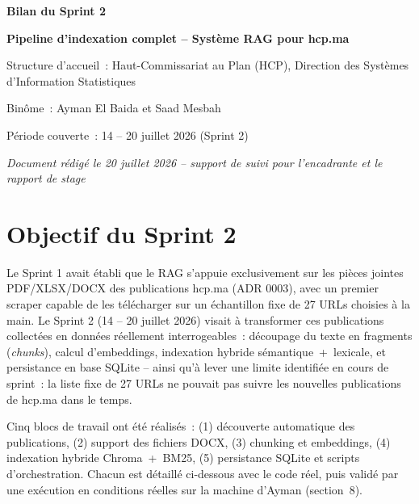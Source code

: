 \documentclass[11pt,a4paper]{article}
\begin{document}
\begin{titlepage}
\centering
\vspace*{2cm}
{\Huge\bfseries\color{navy} Bilan du Sprint 2\par}
\vspace{0.5cm}
{\Large\bfseries\color{gold} Pipeline d'indexation complet -- Syst\`eme RAG pour hcp.ma\par}
\vspace{1.5cm}
{\large\color{greytext} Structure d'accueil~: Haut-Commissariat au Plan (HCP), Direction des Syst\`emes d'Information Statistiques\par}
\vspace{0.3cm}
{\large\color{greytext} Bin\^ome~: Ayman El Baida et Saad Mesbah\par}
\vspace{0.3cm}
{\large\color{greytext} P\'eriode couverte~: 14 -- 20 juillet 2026 (Sprint 2)\par}
\vspace{0.3cm}
{\large\itshape\color{greytext} Document r\'edig\'e le 20 juillet 2026 -- support de suivi pour l'encadrante et le rapport de stage\par}
\vfill
\end{titlepage}

\tableofcontents
\newpage

\section{Objectif du Sprint 2}
Le Sprint 1 avait \'etabli que le RAG s'appuie exclusivement sur les pi\`eces jointes PDF/XLSX/DOCX des publications hcp.ma (ADR 0003), avec un premier scraper capable de les t\'el\'echarger sur un \'echantillon fixe de 27 URLs choisies \`a la main. Le Sprint 2 (14 -- 20 juillet 2026) visait \`a transformer ces publications collect\'ees en donn\'ees r\'eellement interrogeables~: d\'ecoupage du texte en fragments (\emph{chunks}), calcul d'embeddings, indexation hybride s\'emantique~+~lexicale, et persistance en base SQLite -- ainsi qu'\`a lever une limite identifi\'ee en cours de sprint~: la liste fixe de 27 URLs ne pouvait pas suivre les nouvelles publications de hcp.ma dans le temps.

Cinq blocs de travail ont \'et\'e r\'ealis\'es~: (1) d\'ecouverte automatique des publications, (2) support des fichiers DOCX, (3) chunking et embeddings, (4) indexation hybride Chroma~+~BM25, (5) persistance SQLite et scripts d'orchestration. Chacun est d\'etaill\'e ci-dessous avec le code r\'eel, puis valid\'e par une ex\'ecution en conditions r\'eelles sur la machine d'Ayman (section~8).
\end{document}
